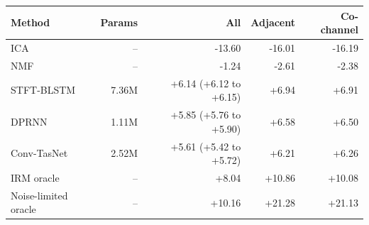 \begin{tabular}{lrrrr}
\toprule
Method & Params & All & Adjacent & Co-channel \\
\midrule
ICA & -- & -13.60 & -16.01 & -16.19 \\
NMF & -- & -1.24 & -2.61 & -2.38 \\
STFT-BLSTM & 7.36M & +6.14 (+6.12 to +6.15) & +6.94 & +6.91 \\
DPRNN & 1.11M & +5.85 (+5.76 to +5.90) & +6.58 & +6.50 \\
Conv-TasNet & 2.52M & +5.61 (+5.42 to +5.72) & +6.21 & +6.26 \\
\midrule
IRM oracle & -- & +8.04 & +10.86 & +10.08 \\
Noise-limited oracle & -- & +10.16 & +21.28 & +21.13 \\
\bottomrule
\end{tabular}
